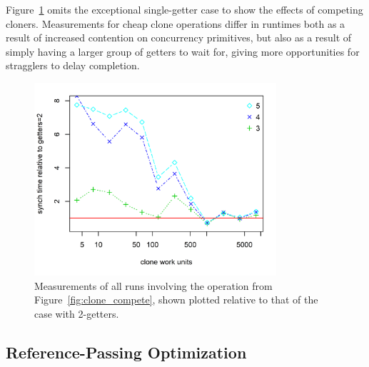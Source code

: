 Figure~\ref{fig:clone_compete_2} omits the exceptional single-getter case to show the effects of competing cloners. Measurements for cheap clone operations differ in runtimes both as a result of increased contention on concurrency primitives, but also as a result of simply having a larger group of getters to wait for, giving more opportunities for stragglers to delay completion. 


\begin{figure}
	\centering
	\includegraphics[width=0.80\textwidth]{experiments/clone_compete_2.png}
	\caption[Duration of interaction in siso connector with clonable data plotted relative to the speed of the 2-getter case.]{Measurements of all runs involving the  operation from Figure~\ref{fig:clone_compete}, shown plotted relative to that of the case with 2-getters.}
	\label{fig:clone_compete_2}
\end{figure}

\subsection{Reference-Passing Optimization}

